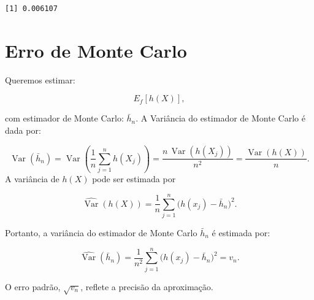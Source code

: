 \documentclass[
  letterpaper,
  DIV=11,
  numbers=noendperiod]{scrreprt}
\begin{document}
\begin{verbatim}
[1] 0.006107
\end{verbatim}

\section{Erro de Monte Carlo}\label{erro-de-monte-carlo}

Queremos estimar:

\[E_f[h(X)],\]

com estimador de Monte Carlo: \(\bar h_n\). A Variância do estimador de
Monte Carlo é dada por:

\[\operatorname{Var}(\bar h_n)
= \operatorname{Var}\left(\frac{1}{n}\sum_{j=1}^n h(X_j)\right)
= \frac{n \, \operatorname{Var}(h(X_j))}{n^2}
= \frac{\operatorname{Var}(h(X))}{n}.
\] A variância de \(h(X)\) pode ser estimada por

\[
\widehat{\operatorname{Var}}(h(X))
= \frac{1}{n}\sum_{j=1}^n \bigl(h(x_j) - \bar h_n\bigr)^2.\]

Portanto, a variância do estimador de Monte Carlo \(\bar h_n\) é
estimada por:

\[\widehat{\operatorname{Var}}(\bar h_n)
= \frac{1}{n^2}\sum_{j=1}^n \bigl(h(x_j) - \bar h_n\bigr)^2
= v_n.\]

O erro padrão, \(\sqrt{v_n}\), reflete a precisão da aproximação.
\end{document}
